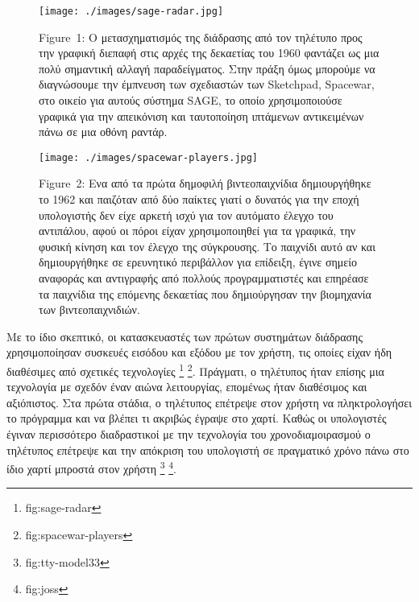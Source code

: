 \documentclass[
]{article}
\begin{document}
\leavevmode{}%
\begin{figure}
\hypertarget{fig:sage-radar}{%
\centering
\texttt{[image: ./images/sage-radar.jpg]}
\caption{Figure~1: Ο μετασχηματισμός της διάδρασης από τον τηλέτυπο προς
την γραφική διεπαφή στις αρχές της δεκαετίας του 1960 φαντάζει ως μια
πολύ σημαντική αλλαγή παραδείγματος. Στην πράξη όμως μπορούμε να
διαγνώσουμε την έμπνευση των σχεδιαστών των Sketchpad, Spacewar, στο
οικείο για αυτούς σύστημα SAGE, το οποίο χρησιμοποιούσε γραφικά για την
απεικόνιση και ταυτοποίηση ιπτάμενων αντικειμένων πάνω σε μια οθόνη
ραντάρ.}\label{fig:sage-radar}
}
\end{figure}

\leavevmode{}%
\begin{figure}
\hypertarget{fig:spacewar-players}{%
\centering
\texttt{[image: ./images/spacewar-players.jpg]}
\caption{Figure~2: Ενα από τα πρώτα δημοφιλή βιντεοπαιχνίδια
δημιουργήθηκε το 1962 και παιζόταν από δύο παίκτες γιατί ο δυνατός για
την εποχή υπολογιστής δεν είχε αρκετή ισχύ για τον αυτόματο έλεγχο του
αντιπάλου, αφού οι πόροι είχαν χρησιμοποιηθεί για τα γραφικά, την φυσική
κίνηση και τον έλεγχο της σύγκρουσης. Το παιχνίδι αυτό αν και
δημιουργήθηκε σε ερευνητικό περιβάλλον για επίδειξη, έγινε σημείο
αναφοράς και αντιγραφής από πολλούς προγραμματιστές και επηρέασε τα
παιχνίδια της επόμενης δεκαετίας που δημιούργησαν την βιομηχανία των
βιντεοπαιχνιδιών.}\label{fig:spacewar-players}
}
\end{figure}

Με το ίδιο σκεπτικό, οι κατασκευαστές των πρώτων συστημάτων διάδρασης
χρησιμοποίησαν συσκευές εισόδου και εξόδου με τον χρήστη, τις οποίες
είχαν ήδη διαθέσιμες από σχετικές τεχνολογίες \footnote{fig:sage-radar}
\footnote{fig:spacewar-players}. Πράγματι, ο τηλέτυπος ήταν επίσης μια
τεχνολογία με σχεδόν έναν αιώνα λειτουργίας, επομένως ήταν διαθέσιμος
και αξιόπιστος. Στα πρώτα στάδια, ο τηλέτυπος επέτρεψε στον χρήστη να
πληκτρολογήσει το πρόγραμμα και να βλέπει τι ακριβώς έγραψε στο χαρτί.
Καθώς οι υπολογιστές έγιναν περισσότερο διαδραστικοί με την τεχνολογία
του χρονοδιαμοιρασμού ο τηλέτυπος επέτρεψε και την απόκριση του
υπολογιστή σε πραγματικό χρόνο πάνω στο ίδιο χαρτί μπροστά στον χρήστη
\footnote{fig:tty-model33} \footnote{fig:joss}.
\end{document}
